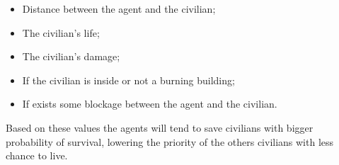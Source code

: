 \begin{itemize}
\item Distance between the agent and the civilian;
\item The civilian's life;
\item The civilian's damage;
\item If the civilian is inside or not a burning building;
\item If exists some blockage between the agent and the civilian.
\end{itemize}

Based on these values the agents will tend to save civilians with bigger probability of survival, lowering the priority of the others civilians with less chance to live.

